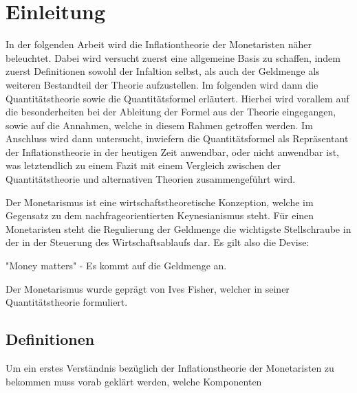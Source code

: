 \documentclass[
	12pt,
	BCOR=5mm,
	DIV=12,
	headinclude=on,
	footinclude=off,
	parskip=half,
	bibliography=totoc,
	listof=entryprefix,
	toc=listof,
	numbers=noenddot,
]{scrreprt}
\begin{document}


\tableofcontents

\listoffigures

\clearpage

\ihead{\chaptername~\thechapter} %
\chapter{Einleitung}

In der folgenden Arbeit wird die Inflationtheorie der Monetaristen näher beleuchtet. Dabei wird versucht zuerst eine allgemeine Basis zu schaffen, indem zuerst Definitionen sowohl der Infaltion selbst, als auch der Geldmenge als weiteren Bestandteil der Theorie aufzustellen. Im folgenden wird dann die Quantitätstheorie sowie die Quantitätsformel erläutert. Hierbei wird vorallem auf die besonderheiten bei der Ableitung der Formel aus der Theorie eingegangen, sowie auf die Annahmen, welche in diesem Rahmen getroffen werden. Im Anschluss wird dann untersucht, inwiefern die Quantitätsformel als Repräsentant der Inflationstheorie in der heutigen Zeit anwendbar, oder nicht anwendbar ist, was letztendlich zu einem Fazit mit einem Vergleich zwischen der Quantitätstheorie und alternativen Theorien zusammengeführt wird.

Der Monetarismus ist eine wirtschaftstheoretische Konzeption, welche im Gegensatz zu dem nachfrageorientierten Keynesianismus steht. Für einen Monetaristen steht die Regulierung der Geldmenge die wichtigste Stellschraube in der in der Steuerung des Wirtschaftsablaufs dar. Es gilt also die Devise:

\begin{center}
    "Money matters" - Es kommt auf die Geldmenge an.
\end{center}

Der Monetarismus wurde geprägt von Ives Fisher, welcher in seiner Quantitätstheorie formuliert.



\section{Definitionen}

Um ein erstes Verständnis bezüglich der Inflationstheorie der Monetaristen zu bekommen muss vorab geklärt werden, welche Komponenten
\end{document}
